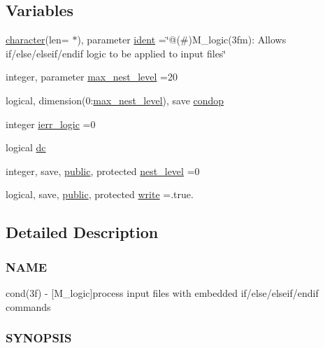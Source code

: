 \subsection*{Variables}
\begin{DoxyCompactItemize}
\item 
\hyperlink{option__stopwatch_83_8txt_abd4b21fbbd175834027b5224bfe97e66}{character}(len= $\ast$), parameter \hyperlink{namespacem__logic_aa4a758529f4ba04d66cddf4cd51e0bc1}{ident} =\char`\"{}@(\#)M\+\_\+logic(3fm)\+: Allows if/else/elseif/endif logic to be applied to input files\char`\"{}
\item 
integer, parameter \hyperlink{namespacem__logic_a22ef0b94ebd8b7f3b35a33c8d9250759}{max\+\_\+nest\+\_\+level} =20
\item 
logical, dimension(0\+:\hyperlink{namespacem__logic_a22ef0b94ebd8b7f3b35a33c8d9250759}{max\+\_\+nest\+\_\+level}), save \hyperlink{namespacem__logic_ad7573389be889c19d1496dc2e9dff9a1}{condop}
\item 
integer \hyperlink{namespacem__logic_a047a31b5831fda2a9421240f1edce712}{ierr\+\_\+logic} =0
\item 
logical \hyperlink{namespacem__logic_ac3811d1cc267a1241feb5f77905110a2}{dc}
\item 
integer, save, \hyperlink{M__stopwatch_83_8txt_a2f74811300c361e53b430611a7d1769f}{public}, protected \hyperlink{namespacem__logic_aba076b8206140be84ad573bc89c82b14}{nest\+\_\+level} =0
\item 
logical, save, \hyperlink{M__stopwatch_83_8txt_a2f74811300c361e53b430611a7d1769f}{public}, protected \hyperlink{namespacem__logic_a487df89eac953b22a40b143aaf8ff1ea}{write} =.true.
\end{DoxyCompactItemize}


\subsection{Detailed Description}
\subsubsection*{N\+A\+ME}

cond(3f) -\/ \mbox{[}M\+\_\+logic\mbox{]}process input files with embedded if/else/elseif/endif commands 

\subsubsection*{S\+Y\+N\+O\+P\+S\+IS}

